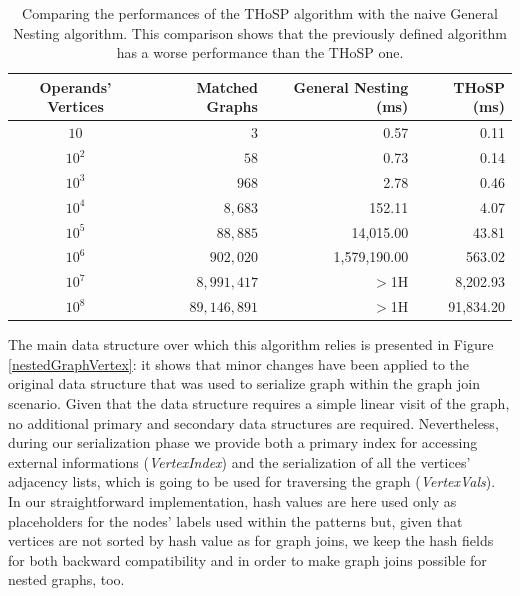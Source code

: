 \begin{table}[!t]
	\centering
\begin{tabular}{@{}cr|rr@{}}
	\toprule
	{\textbf{Operands' Vertices}} & Matched Graphs  & {\textbf{General Nesting} (ms)} & {\textbf{THoSP} (ms)}  \\	
	\midrule
	$10$ & $3$ &  0.57       & 0.11\\
	$10^2$ & $58$  & 0.73        & 0.14\\
	$10^3$  & $968$  & 2.78   & 0.46\\
	$10^4$ & $8,683$   & 152.11   & 4.07\\
	$10^5$ & $88,885$   & 14,015.00 & 43.81 \\
	$10^6$  & $902,020$  &  1,579,190.00      & 563.02\\
	$10^7$ & $8,991,417$   &  $>$1H      & 8,202.93\\
	$10^8$ & $89,146,891$   &  $>$1H      & 91,834.20\\
	\bottomrule
\end{tabular}
	\caption{Comparing the performances of the THoSP algorithm with the naive General Nesting algorithm. This comparison shows that the previously defined algorithm has a worse performance than the THoSP one. }
	\label{tab:comparisonTwo}
\end{table}


The main data structure over which this algorithm relies  is presented in Figure \vref{nestedGraphVertex}: it shows that minor changes have been applied to the original data structure that was used to serialize graph within the graph join scenario. %
Given that the data structure requires a simple linear visit of the graph, no additional primary and secondary data structures are required. Nevertheless, during our serialization phase we provide both a primary index for accessing external informations (\textit{VertexIndex}) and the serialization of all the vertices' adjacency lists, which is going to be used for traversing the graph (\textit{VertexVals}). In our straightforward implementation, hash values are here used only as placeholders for the nodes' labels used within the patterns but, given that vertices are not sorted by hash value as for graph joins, we keep the hash fields for both backward compatibility and in order to make graph joins possible for nested graphs, too.

